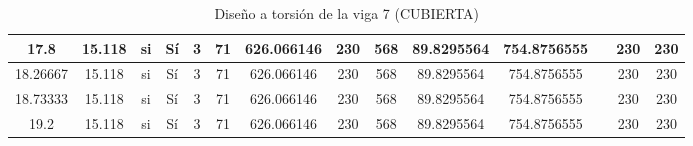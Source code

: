\begin{table}[H]
{\begin{tabular}{|c|c|c|c|c|c|c|c|c|c|c|c|c|c|}
\hline
17.8 & 15.118 & si  & Sí  & 3   & 71  & 626.066146 & 230 & 568 & 89.8295564 & 754.8756555 &     & 230 & 230 \bigstrut\\
\hline
18.26667 & 15.118 & si  & Sí  & 3   & 71  & 626.066146 & 230 & 568 & 89.8295564 & 754.8756555 &     & 230 & 230 \bigstrut\\
\hline
18.73333 & 15.118 & si  & Sí  & 3   & 71  & 626.066146 & 230 & 568 & 89.8295564 & 754.8756555 &     & 230 & 230 \bigstrut\\
\hline
19.2 & 15.118 & si  & Sí  & 3   & 71  & 626.066146 & 230 & 568 & 89.8295564 & 754.8756555 &     & 230 & 230 \bigstrut\\
\hline
\end{tabular}%

  



  }
      \caption{Diseño a torsión de la viga 7 (CUBIERTA) }
  \label{tab:T VG7 CUB }%
\end{table}%